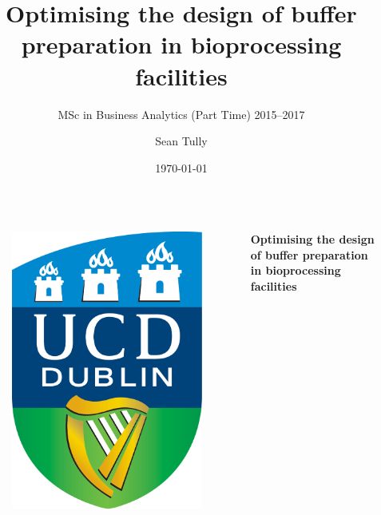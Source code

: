 \documentclass[final]{beamer}
\title{Optimising the design of buffer preparation in bioprocessing facilities}
\institute[UCD]{University College Dublin}
\date{\today}
\subtitle{MSc in Business Analytics (Part Time) 2015--2017}
\author{Sean Tully}
\begin{document}
    \begin{frame}[t]
        \begin{columns}
                \begin{figure}
                    \centering
                    \includegraphics[angle=0,scale=0.08]{ucd_logo.png}
                \end{figure}
            \centering
            \vspace{0.5cm}
            
            \Huge{\textbf{Optimising the design of buffer preparation in
                 bioprocessing facilities}}
                 

\end{columns}
\end{frame}
\end{document}
